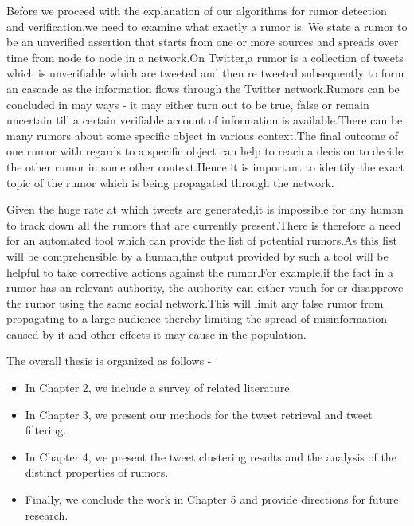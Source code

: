 \par
Before we proceed with the explanation of our algorithms for rumor detection and verification,we need to examine what exactly a rumor is. We state a rumor to be an unverified assertion that starts from one or more sources and spreads over time from node to node in a network.On Twitter,a rumor is a collection of tweets which is unverifiable which are tweeted and then re tweeted subsequently to form an cascade as the information flows through the Twitter network.Rumors can be concluded in may ways - it may either turn out to be true, false or remain uncertain till a certain verifiable account of information is available.There can be many rumors about some specific object in various context.The final outcome of one rumor with regards to a specific object can help to reach a decision to decide the other rumor in some other context.Hence it is important to identify the exact topic of the rumor which is being propagated through the network. 
\\
\par
Given the huge rate at which tweets are generated,it is impossible for any human to track down all the rumors that are currently present.There is therefore a need for an automated tool which can provide the list of potential rumors.As this list will be comprehensible by a human,the output provided by such a tool will be helpful to take corrective actions against the rumor.For example,if the fact in a rumor has an relevant authority, the authority can either vouch for or disapprove the rumor using the same social network.This will limit any false rumor from propagating to a large audience thereby limiting the spread of misinformation caused by it and other effects it may cause in the population. \\
\par
\clearpage
The overall thesis is organized as follows -
\begin{itemize}
	\item In Chapter 2, we include a survey of related literature.
	\item In Chapter 3, we present our methods for the tweet retrieval and tweet filtering. 
	\item In Chapter 4, we present the tweet clustering results and the analysis of the distinct properties of rumors.
	\item Finally, we conclude the work in Chapter 5 and provide directions for future research.  
\end{itemize}

